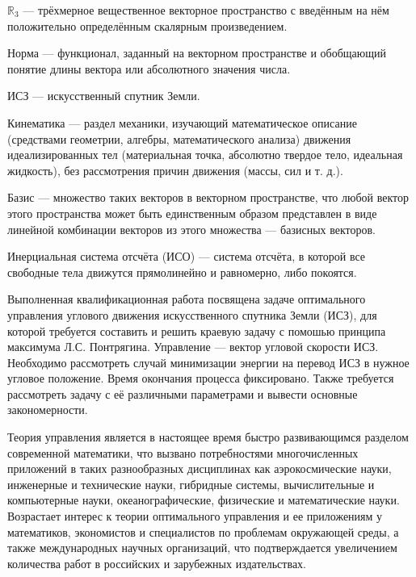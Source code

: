 \documentclass[14pt]{extreport}
\begin{document}


\tableofcontents


\abbrevdef


$\mathbb{R}_3$ --- трёхмерное вещественное векторное пространство с введённым на нём положительно определённым скалярным произведением.

Норма --- функционал, заданный на векторном пространстве и обобщающий понятие длины вектора или абсолютного значения числа.

ИСЗ --- искусственный спутник Земли.

Кинематика --- раздел механики, изучающий математическое описание (средствами геометрии, алгебры, математического анализа)
движения идеализированных тел (материальная точка, абсолютно твердое тело, идеальная жидкость),
без рассмотрения причин движения (массы, сил и т. д.).

Базис --- множество таких векторов в векторном пространстве, что любой вектор этого пространства может быть единственным
образом представлен в виде линейной комбинации векторов из этого множества — базисных векторов.

Инерциальная система отсчёта (ИСО) — система отсчёта, в которой все свободные тела движутся прямолинейно и равномерно, либо покоятся. 



\intro

Выполненная квалификационная работа посвящена задаче оптимального управления углового движения искусственного спутника Земли (ИСЗ), 
для которой требуется составить и решить краевую задачу с помошью принципа максимума Л.С. Понтрягина.
Управление --- вектор угловой скорости ИСЗ. Необходимо рассмотреть случай минимизации энергии на перевод ИСЗ в нужное угловое положение.
Время окончания процесса фиксировано. Также требуется рассмотреть задачу с её различными параметрами и вывести основные закономерности.

Теория управления является в настоящее время быстро развивающимся разделом современной математики, что
вызвано потребностями многочисленных приложений в таких разнообразных
дисциплинах как аэрокосмические науки, инженерные и технические науки, гибридные
системы, вычислительные и
компьютерные науки, океанографические, физические и математические науки. Возрастает интерес к теории оптимального управления
и ее приложениям у математиков, экономистов и специалистов по проблемам окружающей среды, а также международных научных организаций, что
подтверждается увеличением количества работ в российских и зарубежных издательствах.
\end{document}
